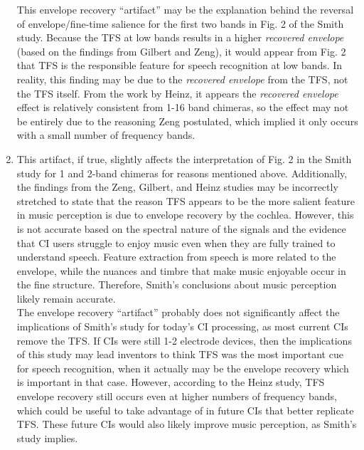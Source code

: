 \documentclass[9pt]{extarticle}
\begin{document}
\begin{enumerate}[label = \alph*)]
This envelope recovery ``artifact'' may be the explanation behind the reversal of envelope/fine-time salience for the first two bands in Fig. 2 of the Smith study. Because the TFS at low bands results in a higher \textit{recovered envelope} (based on the findings from Gilbert and Zeng), it would appear from Fig. 2 that TFS is the responsible feature for speech recognition at low bands. In reality, this finding may be due to the \textit{recovered envelope} from the TFS, not the TFS itself. From the work by Heinz, it appears the \textit{recovered envelope} effect is relatively consistent from 1-16 band chimeras, so the effect may not be entirely due to the reasoning Zeng postulated, which implied it only occurs with a small number of frequency bands.

\item This artifact, if true, slightly affects the interpretation of Fig. 2 in the Smith study for 1 and 2-band chimeras for reasons mentioned above. Additionally, the findings from the Zeng, Gilbert, and Heinz studies may be incorrectly stretched to state that the reason TFS appears to be the more salient feature in music perception is due to envelope recovery by the cochlea. However, this is not accurate based on the spectral nature of the signals and the evidence that CI users struggle to enjoy music even when they are fully trained to understand speech. Feature extraction from speech is more related to the envelope, while the nuances and timbre that make music enjoyable occur in the fine structure. Therefore, Smith's conclusions about music perception likely remain accurate. \\

The envelope recovery ``artifact'' probably does not significantly affect the implications of Smith's study for today's CI processing, as most current CIs remove the TFS. If CIs were still 1-2 electrode devices, then the implications of this study may lead inventors to think TFS was the most important cue for speech recognition, when it actually may be the envelope recovery which is important in that case. However, according to the Heinz study, TFS envelope recovery still occurs even at higher numbers of frequency bands, which could be useful to take advantage of in future CIs that better replicate TFS. These future CIs would also likely improve music perception, as Smith's study implies.  
  
\end{enumerate}
\end{document}
